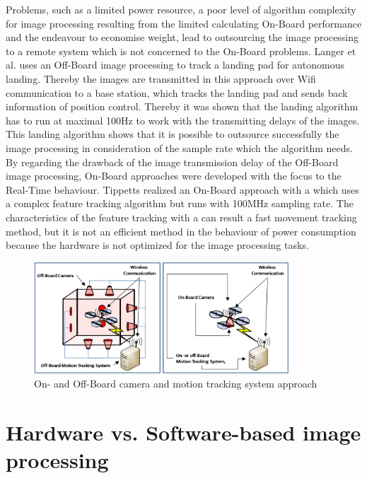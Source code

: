 Problems, such as a limited power resource, a poor level of algorithm complexity
for image processing resulting from the limited calculating On-Board performance
and the endeavour to economise weight, lead to outsourcing the image processing
to a remote system which is not concerned to the On-Board problems. Langer et al.
 uses an Off-Board image
processing to track a landing pad for autonomous landing. Thereby the images are
transmitted in this approach over Wifi communication to a base station, which
tracks the landing pad and sends back information of position control. Thereby it was
shown that the landing algorithm has to run at maximal 100Hz to work with
the transmitting delays of the images.\newpage
 This landing algorithm shows that it is possible to outsource successfully the
 image processing in consideration of the sample rate which the algorithm needs.
By regarding the drawback of the image transmission delay of the Off-Board image
processing, On-Board approaches were developed with the focus to the Real-Time
behaviour. Tippetts  realized an On-Board approach with a \FPGA which uses a complex feature
tracking algorithm but runs with 100MHz sampling rate. The characteristics
of the feature tracking with a \FPGA can result a fast movement tracking method,
but it is not an efficient method in the behaviour of power consumption because
the hardware is not optimized for the image processing tasks.

\begin{figure}[!htbp]
	\centering
		\includegraphics[width=0.85\textwidth]{graphic/Off-BoardvsOn-BoardCameras.png}
	\caption{On- and Off-Board camera and motion tracking system approach}
	\label{fig:Off-BoardvsOn-BoardCameras.png}
\end{figure}

\section{Hardware vs. Software-based image processing}

